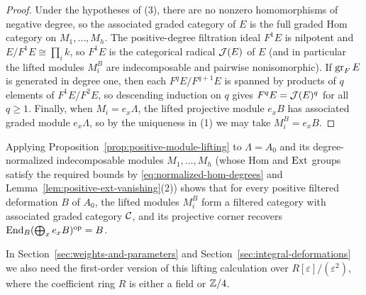 \begin{proof}
Under the hypotheses of (3), there are no nonzero homomorphisms of negative
degree, so the associated graded category of $E$ is the full graded Hom
category on $M_1,\ldots,M_h$. The positive-degree filtration ideal $F^1 E$
is nilpotent and $E/F^1 E\cong\prod_i k$, so $F^1 E$ is the categorical
radical $\mathcal J(E)$ of $E$ (and in particular the lifted modules $M_i^B$ are
indecomposable and pairwise nonisomorphic). If $\operatorname{gr}_F E$ is generated in
degree one, then each $F^q E/F^{q+1}E$ is spanned by products of $q$
elements of $F^1 E/F^2 E$, so descending induction on $q$ gives
$F^q E=\mathcal J(E)^q$ for all $q\geq1$. Finally, when $M_i=e_x\Lambda$, the lifted
projective module $e_x B$ has associated graded module $e_x\Lambda$, so by
the uniqueness in (1) we may take $M_i^B=e_x B$.
\end{proof}

Applying Proposition~\ref{prop:positive-module-lifting} to $\Lambda=A_0$ and
its degree-normalized indecomposable modules $M_1,\ldots,M_h$ (whose Hom and
$\operatorname{Ext}$ groups satisfy the required bounds by \eqref{eq:normalized-hom-degrees}
and Lemma~\ref{lem:positive-ext-vanishing}(2)) shows that for every positive
filtered deformation $B$ of $A_0$, the lifted modules $M_i^B$ form a
filtered category with associated graded category $\mathcal C$, and its projective
corner recovers $\operatorname{End}_B(\bigoplus_x e_x B)^{\mathrm{op}}=B$.

In Section~\ref{sec:weights-and-parameters} and
Section~\ref{sec:integral-deformations} we also need the first-order version
of this lifting calculation over $R[\varepsilon]/(\varepsilon^2)$, where the
coefficient ring $R$ is either a field or $\mathbb Z/4$.

